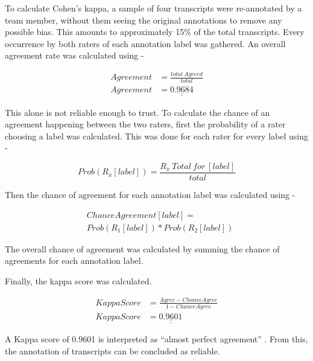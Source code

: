 \documentclass[hidelinks, 11pt]{article}
\begin{document}
To calculate Cohen's kappa, a sample of four transcripts were re-annotated by a team member, without them seeing the original annotations to remove any possible bias. This amounts to approximately 15\% of the total transcripts. Every occurrence by both raters of each annotation label was gathered. An overall agreement rate was calculated using -

\begin{equation} \label{eq:kappa}
  \begin{split}
    Agreement & = \frac{total \: Agreed}{total} \\
    Agreement & = \underline{\underline{0.9684}}
  \end{split}
\end{equation}

This alone is not reliable enough to trust. To calculate the chance of an agreement happening between the two raters, first the probability of a rater choosing a label was calculated. This was done for each rater for every label using -

\begin{equation}
  Prob(R_x[label]) = \frac{R_x \: Total \: for \: [label]}{total}
\end{equation}

Then the chance of agreement for each annotation label was calculated using -

\begin{equation}
  \begin{split}
    &ChanceAgreement[label] = \\
    &Prob(R_1[label]) * Prob(R_2[label])
  \end{split}
\end{equation}

The overall chance of agreement was calculated by summing the chance of agreements for each annotation label.

Finally, the kappa score was calculated.

\begin{equation}
  \begin{split}
    KappaScore & = \frac{Agree - ChanceAgree}{1 - ChanceAgree} \\
    KappaScore & = \underline{\underline{0.9601}}
  \end{split}
\end{equation}

A Kappa score of 0.9601 is interpreted as ``almost perfect agreement'' \cite{Cohen_1960}. From this, the annotation of transcripts can be concluded as reliable.
\end{document}

